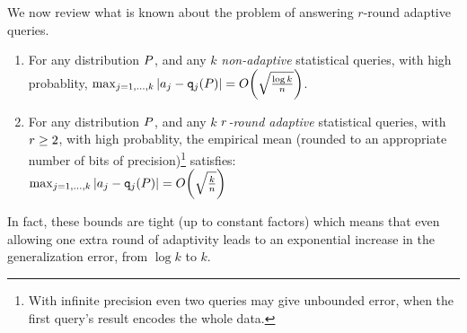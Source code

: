 We now review what is known about the problem of answering $r$-round adaptive queries.  
\begin{thm} 
\label{thm:nonadapt-adapt}
\begin{enumerate}

\item For any distribution $P$, and any $k$ \emph{non-adaptive} statistical queries, with high probablity,
$
\max_{j=1,\dots,k} | \answer_j - \qquery_j(\dist) | = O\left( \sqrt{\frac{\log k}{n}}  \right)
$.
%
\item For any distribution $P$, and  any $k$  \emph{$r$-round adaptive} statistical queries, with $r \geq 2$, with high probablity, the empirical mean (rounded to an appropriate number of bits of precision)\footnote{With infinite precision even two queries may give unbounded error, when the first query's result encodes the whole data.} satisfies:\\
$
\max_{j=1,\dots,k} | \answer_j - \qquery_j(\dist) | = O\left( \sqrt{\frac{k}{n}}  \right)
$
\end{enumerate}
\end{thm}
In fact, these bounds are tight (up to constant factors) which means that even allowing one extra round of adaptivity leads to an exponential increase in the generalization error, from $\log k$ to $k$.

